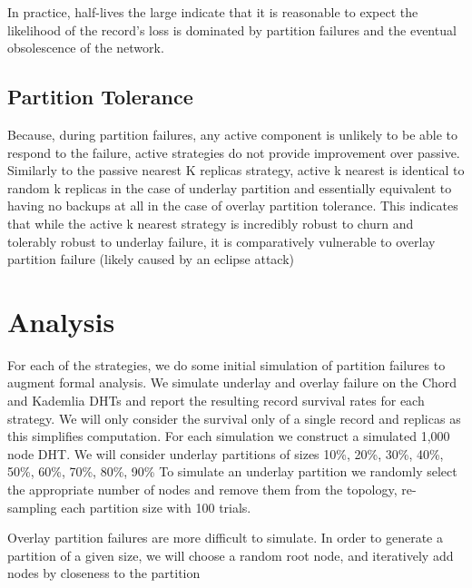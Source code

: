 \documentclass[conference]{IEEEtran}
\begin{document}
In practice, half-lives the large indicate that it is reasonable to expect the likelihood of the record's loss is dominated by partition failures and the eventual obsolescence of the network.

\subsection{Partition Tolerance}
Because, during partition failures, any active component is unlikely to be able to respond to the failure, active strategies do not provide improvement over passive.
Similarly to the passive nearest K replicas strategy, active k nearest is identical to random k replicas in the case of underlay partition and essentially equivalent to having no backups at all in the case of overlay partition tolerance.
This indicates that while the active k nearest strategy is incredibly robust to churn and tolerably robust to underlay failure, it is comparatively vulnerable to overlay partition failure (likely caused by an eclipse attack)


\section{Analysis}

For each of the strategies, we do some initial simulation of partition failures to augment formal analysis.
We simulate underlay and overlay failure on the Chord and Kademlia DHTs and report the resulting record survival rates for each strategy.
We will only consider the survival only of a single record and replicas as this simplifies computation. 
For each simulation we construct a simulated 1,000 node DHT.
We will consider underlay partitions of sizes 10\%, 20\%, 30\%, 40\%, 50\%, 60\%, 70\%, 80\%, 90\%
To simulate an underlay partition we randomly select the appropriate number of nodes and remove them from the topology, re-sampling each partition size with 100 trials.

Overlay partition failures are more difficult to simulate.
In order to generate a partition of a given size, we will choose a random root node, and iteratively add nodes by closeness to the partition 
\end{document}
